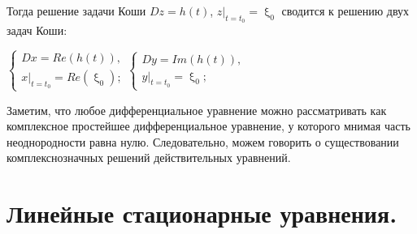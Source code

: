 \documentclass[a4paper, 12pt]{report}
\renewcommand{\xi}{\upxi}
\begin{document}
	Тогда решение задачи Коши $Dz = h(t)$, $z|_{t=t_0} = \xi_0$ сводится к решению двух задач Коши:\begin{center}
		$\begin{cases}
			Dx = Re (h(t)),\\
			x|_{t=t_0} = Re(\xi_0);
		\end{cases}$\qquad $\begin{cases}
			Dy = Im (h(t)),\\
			y|_{t=t_0} = \xi_0;
		\end{cases}$
	\end{center}
	Заметим, что любое дифференциальное уравнение можно рассматривать как комплексное простейшее дифференциальное уравнение, у которого мнимая часть неоднородности равна нулю. Следовательно, можем говорить о существовании комплекснозначных решений действительных уравнений.
	\chapter{Линейные стационарные уравнения.}
\end{document}
